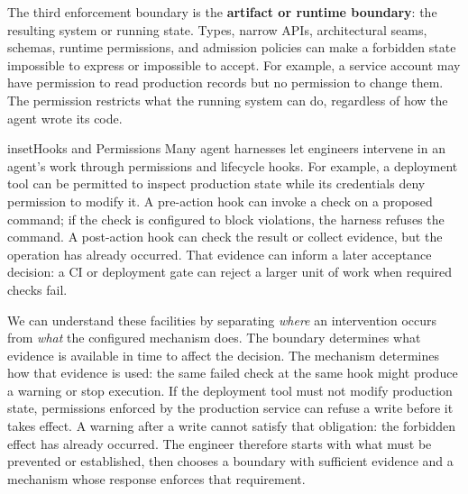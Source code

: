 

The third enforcement boundary is the \textbf{artifact or runtime boundary}: the resulting system or running state. Types, narrow APIs, architectural seams, schemas, runtime permissions, and admission policies can make a forbidden state impossible to express or impossible to accept. For example, a service account may have permission to read production records but no permission to change them. The permission restricts what the running system can do, regardless of how the agent wrote its code.




\begin{bookbox}{inset}{Hooks and Permissions}
\label{inset-hooks-and-permissions}
Many agent harnesses let engineers intervene in an agent's work through permissions and lifecycle hooks. For example, a deployment tool can be permitted to inspect production state while its credentials deny permission to modify it. A pre-action hook can invoke a check on a proposed command; if the check is configured to block violations, the harness refuses the command. A post-action hook can check the result or collect evidence, but the operation has already occurred. That evidence can inform a later acceptance decision: a CI or deployment gate can reject a larger unit of work when required checks fail.

We can understand these facilities by separating \emph{where} an intervention occurs from \emph{what} the configured mechanism does. The boundary determines what evidence is available in time to affect the decision. The mechanism determines how that evidence is used: the same failed check at the same hook might produce a warning or stop execution. If the deployment tool must not modify production state, permissions enforced by the production service can refuse a write before it takes effect. A warning after a write cannot satisfy that obligation: the forbidden effect has already occurred. The engineer therefore starts with what must be prevented or established, then chooses a boundary with sufficient evidence and a mechanism whose response enforces that requirement.
\end{bookbox}

